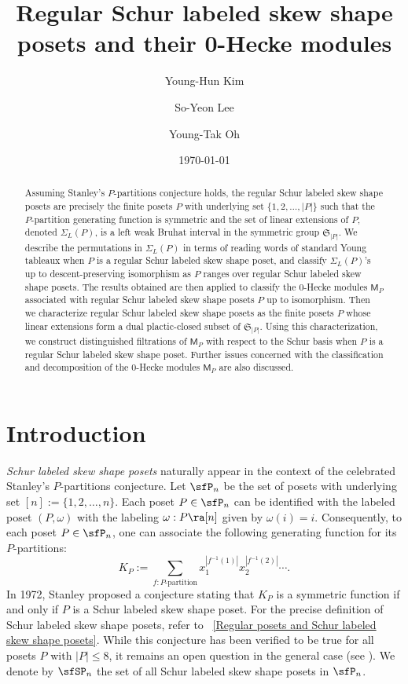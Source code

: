 \documentclass[12pt, reqno]{amsart}
\title[Regular Schur labeled skew shape posets and their 0-Hecke modules]{
Regular Schur labeled skew shape posets and their 0-Hecke modules}
\author[Y.-H. Kim]{Young-Hun Kim}
\author[S.-Y. Lee]{So-Yeon Lee}
\author[Y.-T. Oh]{Young-Tak Oh}
\date{\today}
\theoremstyle{definition}
\numberwithin{equation}{section} \numberwithin{figure}{section}
\numberwithin{table}{section}
\begin{document}
\maketitle






\begin{abstract}
Assuming Stanley's $P$-partitions conjecture holds, the regular Schur labeled skew shape posets are precisely the finite posets $P$ with underlying set $\{1, 2, \ldots, |P|\}$
such that the $P$-partition generating function is symmetric and the set of linear extensions of $P$, denoted  $\Sigma_L(P)$, is a left weak Bruhat interval in the symmetric group $\mathfrak{S}_{|P|}$.
We describe the permutations in $\Sigma_L(P)$ in terms of reading words of standard Young tableaux when $P$ is a regular Schur labeled skew shape poset, and classify $\Sigma_L(P)$'s up to descent-preserving isomorphism as $P$ ranges over regular Schur labeled skew shape posets.
The results obtained are then applied to classify the $0$-Hecke modules $\mathsf{M}_P$ associated with regular Schur labeled skew shape posets $P$ up to isomorphism. 
Then we characterize  regular Schur labeled skew shape posets as the finite posets $P$ whose linear extensions form a dual plactic-closed subset of  $\mathfrak{S}_{|P|}$. 
Using this characterization, we construct  distinguished filtrations of $\mathsf{M}_P$ with respect to the Schur basis 
when $P$ is a regular Schur labeled skew shape poset.
Further issues concerned with the classification and decomposition of the $0$-Hecke modules $\mathsf{M}_P$ are also discussed.
\end{abstract}




\tableofcontents



\section{Introduction}
\emph{Schur labeled skew shape posets} naturally appear in the context of the celebrated  Stanley's $P$-partitions conjecture. 
Let $\sfP_n$ be the set of posets with underlying set $[n] := \{1,2,\ldots, n\}$. Each poset $P \in \sfP_n$ can be identified with the labeled poset $(P, \omega)$ with the labeling $\omega: P \ra [n]$ given by $\omega(i) = i$.
Consequently, to each poset $P\in \sfP_n$, 
one can associate the following generating function for its $P$-partitions: 
\[
K_{P} := \sum_{f: \text{$P$-partition}}
x_1^{|f^{-1}(1)|} x_2^{|f^{-1}(2)|} \cdots.
\]
In 1972, Stanley \cite[p. 81]{72Stanley} proposed a conjecture stating that $K_P$ is a symmetric function if and only if $P$ is a Schur labeled skew shape poset. 
For the precise definition of Schur labeled skew shape posets, refer to ~\cref{Regular posets and Schur labeled skew shape posets}.
While this conjecture has been verified to be true for all posets $P$ with $|P| \le 8$, it remains an open question in the general case (see \cite{06McNamara}).
We denote by $\sfSP_n$ the set of all Schur labeled skew shape posets in $\sfP_n$.
\end{document}
